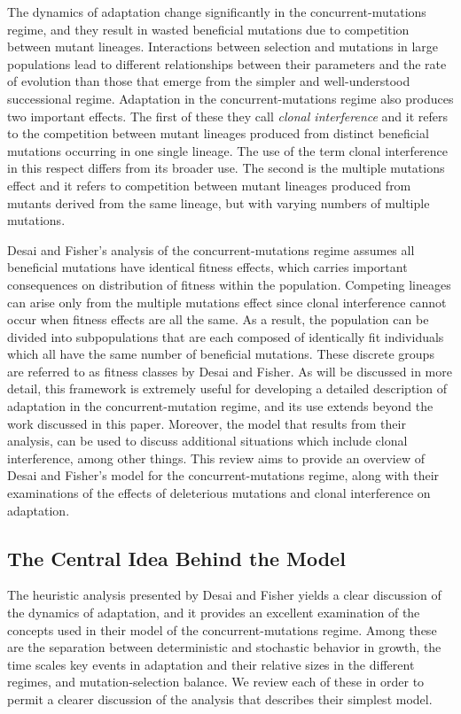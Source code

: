 \documentclass[12pt]{article}
\begin{document}
The dynamics of adaptation change significantly in the concurrent-mutations regime, and they result in wasted beneficial mutations due to competition between mutant lineages.  Interactions between selection and mutations in large populations lead to different relationships between their parameters and the rate of evolution than those that emerge from the simpler and well-understood successional regime.  Adaptation in the concurrent-mutations regime also produces two important effects.  The first of these they call \textit{clonal interference} and it refers to the competition between mutant lineages produced from distinct beneficial mutations occurring in one single lineage.  The use of the term clonal interference in this respect differs from its broader use.  The second is the multiple mutations effect and it refers to competition between mutant lineages produced from mutants derived from the same lineage, but with varying numbers of multiple mutations.  

Desai and Fisher's analysis of the concurrent-mutations regime assumes all beneficial mutations have identical fitness effects, which carries important consequences on distribution of fitness within the population.  Competing lineages can arise only from the multiple mutations effect since clonal interference cannot occur when fitness effects are all the same.  As a result, the population can be divided into subpopulations that are each composed of identically fit individuals which all have the same number of beneficial mutations.  These discrete groups are referred to as fitness classes by Desai and Fisher.  As will be discussed in more detail, this framework is extremely useful for developing a detailed description of adaptation in the concurrent-mutation regime, and its use extends beyond the work discussed in this paper.  Moreover, the model that results from their analysis, can be used to discuss additional situations which include clonal interference, among other things.  This review aims to provide an overview of Desai and Fisher's model for the concurrent-mutations regime, along with their examinations of the effects of deleterious mutations and clonal interference on adaptation.

\subsection*{The Central Idea Behind the Model}
The heuristic analysis presented by Desai and Fisher yields a clear discussion of the dynamics of adaptation, and it provides an excellent examination of the concepts used in their model of the concurrent-mutations regime.  Among these are the separation between deterministic and stochastic behavior in growth, the time scales key events in adaptation and their relative sizes in the different regimes, and mutation-selection balance.  We review each of these in order to permit a clearer discussion of the analysis that describes their simplest model.     
\end{document}

